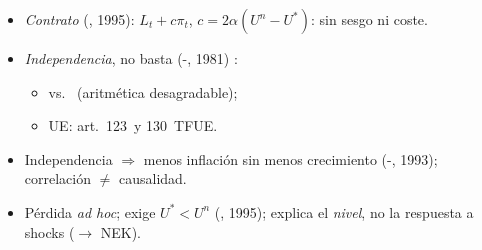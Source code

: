 \documentclass{article}
\begin{document}
\begin{columnas}
\begin{itemize}
  \begin{itemize}
  \item \emph{Credibilidad vs.\ flexibilidad}: $\gamma'$ óptimo finito.
  \end{itemize}
\item \emph{Contrato} (, 1995): $L_t+c\pi_t$, $c=2\alpha(U^n-U^*)$: sin sesgo ni coste.
\item \emph{Independencia}, no basta (-, 1981) :
  \begin{itemize}
  \item {} vs.\  (aritmética desagradable);
  \item UE: art.\ 123~y 130~TFUE.
  \end{itemize}
\end{itemize}
\begin{itemize}
\item Independencia $\Rightarrow$ menos inflación sin menos crecimiento (-, 1993); correlación $\neq$ causalidad.
\item Pérdida \emph{ad hoc}; exige $U^*<U^n$ (, 1995); explica el \emph{nivel}, no la respuesta a shocks ($\to$ NEK).
\end{itemize}


\end{columnas}
\end{document}

